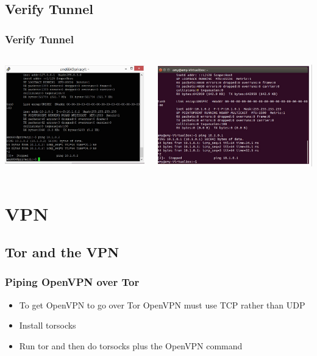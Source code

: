 \documentclass{beamer}
\begin{document}
\subsection{Verify Tunnel}
\begin{frame}
\frametitle{Verify Tunnel}
\begin{columns}
    \begin{column}{0.48\textwidth}
        \includegraphics[width=.9\linewidth]{left}
    \end{column}
    \begin{column}{.5\textwidth}
        \includegraphics[width=.9\linewidth]{right}
    \end{column}
\end{columns}
\end{frame}


\section{VPN}
\subsection{Tor and the VPN}
\begin{frame}
\frametitle{Piping OpenVPN over Tor}
\begin{itemize}
\item To get OpenVPN to go over Tor OpenVPN must use TCP rather than UDP
\item Install torsocks
\item Run tor and then do torsocks plus the OpenVPN command
\end{itemize}
\end{frame}
\end{document}
